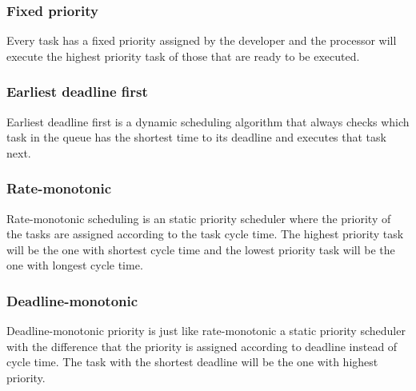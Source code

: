 \subsubsection{Fixed priority}
Every task has a fixed priority assigned by the developer and the processor will execute the highest priority task of those that are ready to be executed. 
\subsubsection{Earliest deadline first}
Earliest deadline first is a dynamic scheduling algorithm that always checks which task in the queue has the shortest time to its deadline and executes that task next.
\subsubsection{Rate-monotonic}
Rate-monotonic scheduling is an static priority scheduler where the priority of the tasks are assigned according to the task cycle time. The highest priority task will be the one with shortest cycle time and the lowest priority task will be the one with longest cycle time.
\subsubsection{Deadline-monotonic}
Deadline-monotonic priority is just like rate-monotonic a static priority scheduler with the difference that the priority is assigned according to deadline instead of cycle time. The task with the shortest deadline will be the one with highest priority.